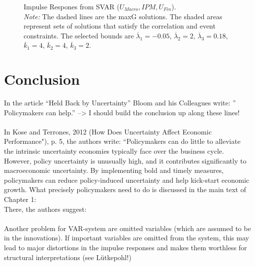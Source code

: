 \documentclass[a4paper,11pt,listof=nochaptergap,oneside,pointednumbers,bibtotoc,bigheadings,liststotoc]{scrbook}
\theoremstyle{mysatz}
\theoremstyle{mydefinition}
\theoremstyle{mybemerkung}
\begin{document}
\begin{figure}[!h]
   \centering
   \setlength\fboxsep{0pt}
   \setlength\fboxrule{0pt}
      \caption[Impulse Respones from SVAR ($U_{Macro}, IPM, U_{Fin}$).]{Impulse Respones from SVAR ($U_{Macro}, IPM, U_{Fin}$).\\
      \textit{Note:}  The dashed lines are the maxG solutions. The shaded areas represent sets of solutions that satisfy the correlation and event constraints. The selected bounds are $\overline{\lambda}_1 = -0.05$, $\overline{\lambda}_2 = 2$, $\overline{\lambda}_3 = 0.18$, $\overline{k}_1 = 4$, $\overline{k}_2 = 4$, $\overline{k}_3 = 2$.}   \label{fig:impulse.responses_all.SVAR}
\end{figure}




\chapter{Conclusion}
\label{Conclusion}




In the article ``Held Back by Uncertainty'' Bloom and his Colleagues write: '' Policymakers can help.'' --> I should build the conclusion up along these lines! \\
\\
In Kose and Terrones, 2012 (How Does Uncertainty Affect Economic Performance"), p. 5, the authors write: ``Policymakers can do little to alleviate the intrinsic uncertainty economies typically face over the business cycle. However, policy uncertainty is unusually high, and it contributes significantly to macroeconomic uncertainty. By implementing bold and timely measures, policymakers can reduce policy-induced uncertainty and help kick-start economic growth. What precisely policymakers need to do is discussed in the main text of Chapter 1:\\
There, the authors suggest: 
\\
\\
Another problem for VAR-system are omitted variables (which are assumed to be in the innovations). If important variables are omitted from the system, this may lead to major distortions in the impulse responses and makes them worthless for structural interpretations (see Lütkepohl!)
\end{document}
